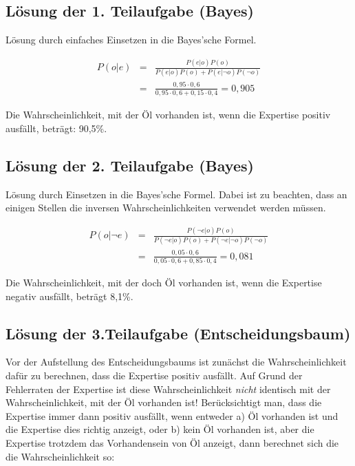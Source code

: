 \documentclass[10pt, a4paper, german]{article}
\numberwithin {equation}{section}
\begin{document}
\subsection{Lösung der 1. Teilaufgabe (Bayes)}

Lösung durch einfaches Einsetzen in die Bayes'sche Formel.

\begin{eqnarray*}
P(o|e) & = & \frac{P(e|o)P(o)}{P(e|o)P(o) + P(e|\neg o)P(\neg o)} \\
       & = & \frac{0,95\cdot 0,6}{0,95\cdot 0,6 + 0,15\cdot 0,4} = 0,905 
\end{eqnarray*}

Die Wahrscheinlichkeit, mit der Öl vorhanden ist, wenn die Expertise positiv
ausfällt, beträgt: 90,5\%.

\subsection{Lösung der 2. Teilaufgabe (Bayes)}

Lösung durch Einsetzen in die Bayes'sche Formel. Dabei ist zu beachten, dass
an einigen Stellen die inversen Wahrscheinlichkeiten verwendet werden müssen.

\begin{eqnarray*}
P(o|\neg e) & = & \frac{P(\neg e|o)P(o)}{P(\neg e|o)P(o) + P(\neg e|\neg
o)P(\neg o)} \\ & = & \frac{0,05\cdot 0,6}{0,05\cdot 0,6 + 0,85\cdot 0,4} 
= 0,081
\end{eqnarray*}



Die Wahrscheinlichkeit, mit der doch Öl vorhanden ist, wenn die Expertise
negativ ausfällt, beträgt 8,1\%.

\subsection{Lösung der 3.Teilaufgabe (Entscheidungsbaum)}

Vor der Aufstellung des Entscheidungsbaums ist zunächst die Wahrscheinlichkeit
dafür zu berechnen, dass die Expertise positiv ausfällt. Auf Grund der
Fehlerraten der Expertise ist diese Wahrscheinlichkeit {\em nicht} identisch
mit der Wahrscheinlichkeit, mit der Öl vorhanden ist! Berücksichtigt man, dass
die Expertise immer dann positiv ausfällt, wenn entweder a) Öl vorhanden ist
und die Expertise dies richtig anzeigt, oder b) kein Öl vorhanden ist, aber die
Expertise trotzdem das Vorhandensein von Öl anzeigt, dann berechnet sich die
die Wahrscheinlichkeit so:
\end{document}
